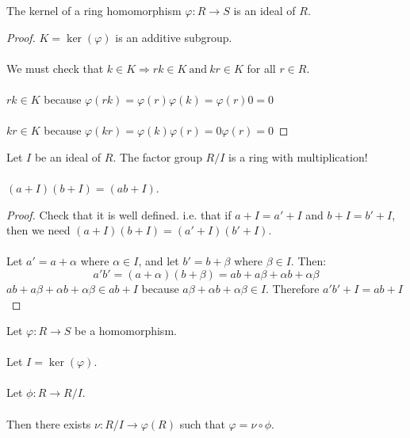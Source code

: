 \documentclass[class=scrartcl, crop=false]{standalone}
\begin{document}
\begin{proposition}
  The kernel of a ring homomorphism $\varphi: R \to S$ is an ideal of $R$.
  \begin{proof}
    $K = \ker(\varphi)$ is an additive subgroup.
    \\\\
    We must check that $k \in K \Rightarrow rk \in K \ \text{and} \ kr \in K$ for all $r \in R$.
    \\\\
    $rk \in K$ because $\varphi(rk) = \varphi(r)\varphi(k) = \varphi(r)0 = 0$ 
    \\\\
    $kr \in K$ because $\varphi(kr) = \varphi(k)\varphi(r) = 0\varphi(r) = 0$ 

  \end{proof} 
\end{proposition} 
\begin{theorem}
  Let $I$ be an ideal of $R$. The factor group $R / I$ is a ring with multiplication! 
  \\\\
  $(a + I)(b + I) = (ab + I)$.
  \begin{proof}
    Check that it is well defined. i.e. that if $a + I = a' + I$ and $b + I = b' + I$, then we need $(a + I)(b + I) = (a' + I)(b' + I)$.
    \\\\
    Let $a' = a + \alpha$ where $\alpha \in I$, and let $b' = b + \beta$ where $\beta \in I$. Then:
    \[
      a'b' = (a + \alpha)(b + \beta) = ab + a\beta + \alpha b + \alpha \beta
    \]
    $ab + a\beta + \alpha b + \alpha\beta \in ab + I$ because $a\beta + \alpha b + \alpha \beta \in I$. Therefore $a'b' + I = ab + I$
  \end{proof} 
\end{theorem} 

\begin{theorem}
  Let $\varphi: R \to S$ be a homomorphism.
  \\\\
  Let $I = \ker(\varphi)$.
  \\\\
  Let $\phi: R \to R / I$.
  \\\\
  Then there exists $\nu: R / I \to \varphi(R)$ such that $\varphi = \nu \circ \phi$.
  
\end{theorem} 
\end{document}
